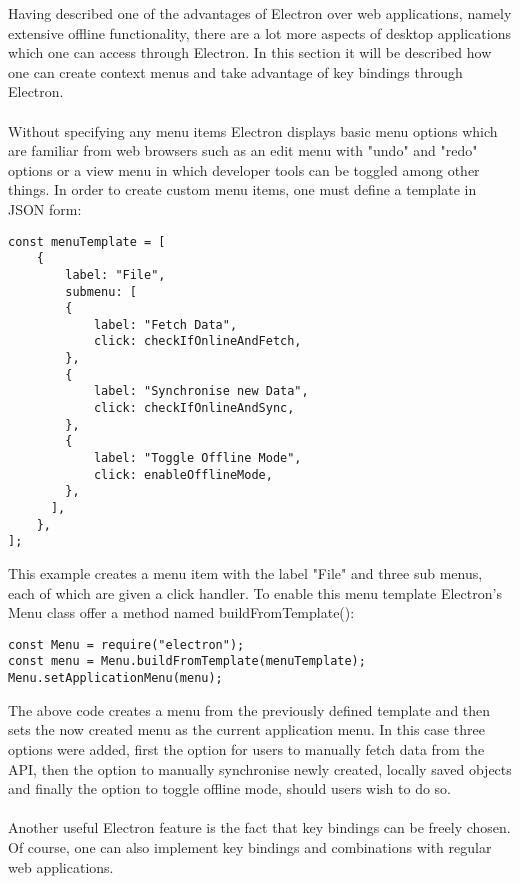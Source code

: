 
Having described one of the advantages of Electron over web applications, namely 
extensive offline functionality, there are a lot more aspects of desktop applications
which one can access through Electron.
In this section it will be described how one can create context menus and take advantage 
of key bindings through Electron.\paragraph{}
Without specifying any menu items Electron displays basic menu options which are familiar from 
web browsers such as an edit menu with "undo" and "redo" options or a view menu in which developer
tools can be toggled among other things.
In order to create custom menu items, one must define a template in JSON form:
\begin{lstlisting}[caption=Menu template for Electron.]
const menuTemplate = [
    {
        label: "File",
        submenu: [
        {
            label: "Fetch Data",
            click: checkIfOnlineAndFetch,
        },
        {
            label: "Synchronise new Data",
            click: checkIfOnlineAndSync,
        },
        {
            label: "Toggle Offline Mode",
            click: enableOfflineMode,
        },
      ],
    },
];
\end{lstlisting}
This example creates a menu item with the label "File" and three sub menus, each of which are given 
a click handler. 
To enable this menu template Electron's Menu class offer a method named buildFromTemplate():
\begin{lstlisting}[caption=Enabling the custom menu.]
const Menu = require("electron");
const menu = Menu.buildFromTemplate(menuTemplate);
Menu.setApplicationMenu(menu);
\end{lstlisting}
The above code creates a menu from the previously defined template and then sets the now created menu
as the current application menu. 
In this case three options were added, first the option for users to manually fetch data from the API,
then the option to manually synchronise newly created, locally saved objects and finally the option
to toggle offline mode, should users wish to do so.\paragraph{}
Another useful Electron feature is the fact that key bindings can be freely chosen. 
Of course, one can also implement key bindings and combinations with regular web applications.
